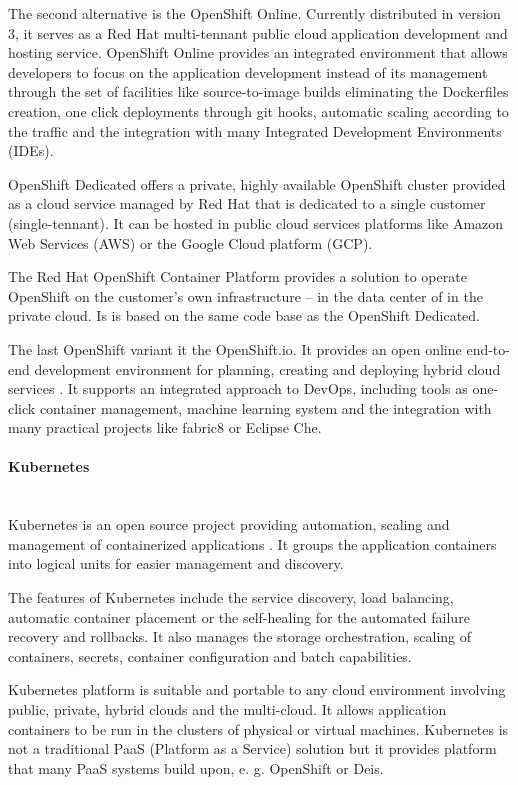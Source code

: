 \documentclass[oneside,
  digital, %
  table,   %
  lof,     %
  lot,     %
]{fithesis3}
\newcommand{\newlinepar}[1]{\paragraph{#1}\needspace{4\baselineskip}\mbox{}\\}
\begin{document}
The second alternative is the OpenShift Online. Currently distributed in version 3, it serves as a Red Hat multi-tennant public cloud application development and hosting service. OpenShift Online provides an integrated environment that allows developers to focus on the application development instead of its management through the set of facilities like source-to-image builds eliminating the Dockerfiles creation, one click deployments through git hooks, automatic scaling according to the traffic and the integration with many Integrated Development Environments (IDEs).

OpenShift Dedicated offers a private, highly available OpenShift cluster provided as a cloud service managed by Red Hat that is dedicated to a single customer (single-tennant). It can be hosted in public cloud services platforms like Amazon Web Services (AWS) or the Google Cloud platform (GCP).

The Red Hat OpenShift Container Platform provides a solution to operate OpenShift on the customer's own infrastructure -- in the data center of in the private cloud. Is is based on the same code base as the OpenShift Dedicated.

The last OpenShift variant it the OpenShift.io. It provides an open online end-to-end development environment for planning, creating and deploying hybrid cloud services \cite{openshift_io}. It supports an integrated approach to DevOps, including tools as one-click container management, machine learning system and the integration with many practical projects like fabric8 or Eclipse Che.

\newlinepar{Kubernetes}

Kubernetes is an open source project providing automation, scaling and management of containerized applications \cite{kubernetes}. It groups the application containers into logical units for easier management and discovery.

The features of Kubernetes include the service discovery, load balancing, automatic container placement or the self-healing for the automated failure recovery and rollbacks. It also manages the storage orchestration, scaling of containers, secrets, container configuration and batch capabilities.

Kubernetes platform is suitable and portable to any cloud environment involving public, private, hybrid clouds and the multi-cloud. It allows application containers to be run in the clusters of physical or virtual machines. Kubernetes is not a traditional PaaS (Platform as a Service) solution but it provides platform that many PaaS systems build upon, e. g. OpenShift or Deis.
\end{document}
